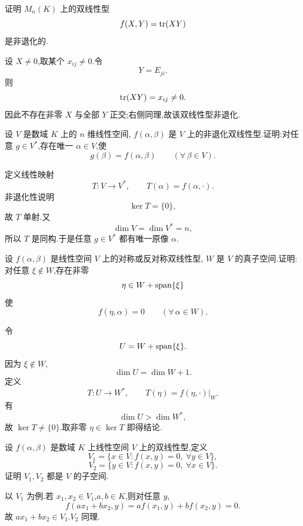 \begin{example}
证明 $M_n(K)$ 上的双线性型
\[
f(X,Y)=\operatorname{tr}(XY)
\]
是非退化的.
\end{example}
\exampleblank

\begin{solution}
设 $X\neq0$,取某个 $x_{ij}\neq0$.令
\[
Y=E_{ji}.
\]
则
\[
\operatorname{tr}(XY)=x_{ij}\neq0.
\]
因此不存在非零 $X$ 与全部 $Y$ 正交;右侧同理,故该双线性型非退化.
\end{solution}


\begin{example}
设 $V$ 是数域 $K$ 上的 $n$ 维线性空间,
$f(\alpha,\beta)$ 是 $V$ 上的非退化双线性型.证明:对任意
$g\in V^*$,存在唯一 $\alpha\in V$,使
\[
g(\beta)=f(\alpha,\beta)
\qquad
(\forall\,\beta\in V).
\]
\end{example}
\exampleblank

\begin{solution}
定义线性映射
\[
T:V\to V^*,
\qquad
T(\alpha)=f(\alpha,\cdot).
\]
非退化性说明
\[
\ker T=\{0\},
\]
故 $T$ 单射.又
\[
\dim V=\dim V^*=n,
\]
所以 $T$ 是同构.于是任意 $g\in V^*$ 都有唯一原像 $\alpha$.
\end{solution}


\begin{example}
设 $f(\alpha,\beta)$ 是线性空间 $V$ 上的对称或反对称双线性型,
$W$ 是 $V$ 的真子空间.证明:对任意 $\xi\notin W$,存在非零
\[
\eta\in W+\operatorname{span}\{\xi\}
\]
使
\[
f(\eta,\alpha)=0
\qquad
(\forall\,\alpha\in W).
\]
\end{example}
\exampleblank

\begin{solution}
令
\[
U=W+\operatorname{span}\{\xi\}.
\]
因为 $\xi\notin W$,
\[
\dim U=\dim W+1.
\]
定义
\[
T:U\to W^*,
\qquad
T(\eta)=f(\eta,\cdot)|_W.
\]
有
\[
\dim U>\dim W^*,
\]
故 $\ker T\neq\{0\}$.取非零 $\eta\in\ker T$ 即得结论.
\end{solution}


\begin{example}
设 $f(\alpha,\beta)$ 是数域 $K$ 上线性空间 $V$ 上的双线性型,定义
\[
V_1=\{x\in V:f(x,y)=0,\ \forall y\in V\},
\]
\[
V_2=\{y\in V:f(x,y)=0,\ \forall x\in V\}.
\]
证明 $V_1,V_2$ 都是 $V$ 的子空间.
\end{example}
\exampleblank

\begin{solution}
以 $V_1$ 为例.若 $x_1,x_2\in V_1$,$a,b\in K$,则对任意 $y$,
\[
f(ax_1+bx_2,y)
=
af(x_1,y)+bf(x_2,y)=0.
\]
故 $ax_1+bx_2\in V_1$.$V_2$ 同理.
\end{solution}


